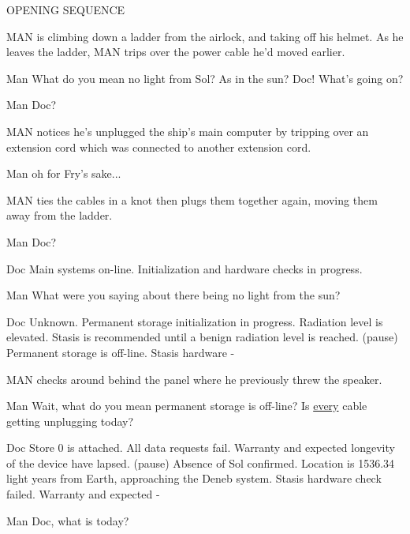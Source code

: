 \documentclass{screenplay}
\begin{document}
OPENING SEQUENCE

\fadein
{}
MAN is climbing down a ladder from the airlock, and taking off his helmet.  As he leaves the ladder, MAN trips over the power cable he'd moved earlier.
\begin{dialogue}{Man}
What do you mean no light from Sol?  As in the sun?  Doc!  What's going on?
\end{dialogue}
\begin{dialogue}{Man}
Doc?
\end{dialogue}
MAN notices he's unplugged the ship's main computer by tripping over an extension cord which was connected to another extension cord.
\begin{dialogue}{Man}
oh for Fry's sake...
\end{dialogue}
MAN ties the cables in a knot then plugs them together again, moving them away from the ladder.
\begin{dialogue}{Man}
Doc?
\end{dialogue}
\begin{dialogue}{Doc}
Main systems on-line.  Initialization and hardware checks in progress.
\end{dialogue}
\begin{dialogue}{Man}
What were you saying about there being no light from the sun?
\end{dialogue}
\begin{dialogue}{Doc}
Unknown.  Permanent storage initialization in progress.  Radiation level is elevated.  Stasis is recommended until a benign radiation level is reached.  (pause)  Permanent storage is off-line.  Stasis hardware -
\end{dialogue}
MAN checks around behind the panel where he previously threw the speaker.
\begin{dialogue}[interrupting]{Man}
Wait, what do you mean permanent storage is off-line?  Is \underline{every} cable getting unplugging today?
\end{dialogue}
\begin{dialogue}{Doc}
Store 0 is attached.  All data requests fail.  Warranty and expected longevity of the device have lapsed.  (pause)  Absence of Sol confirmed.  Location is 1536.34 light years from Earth, approaching the Deneb system.  Stasis hardware check failed.  Warranty and expected -
\end{dialogue}
\begin{dialogue}{Man}
Doc, what is today?
\end{dialogue}
\end{document}
